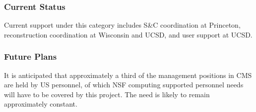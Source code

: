 \documentclass[11pt,a4paper]{article}
\begin{document}
\subsubsection{Current Status}

Current support under this category includes S\&C coordination at
Princeton, reconstruction coordination at Wisconsin and UCSD, and user
support at UCSD.  

\subsubsection{Future Plans}

It is anticipated that approximately a third of the management positions
in CMS are held by US personnel, of which NSF computing supported 
personnel needs will have to be covered by this project.  The need
is likely to remain approximately constant.
\end{document}

